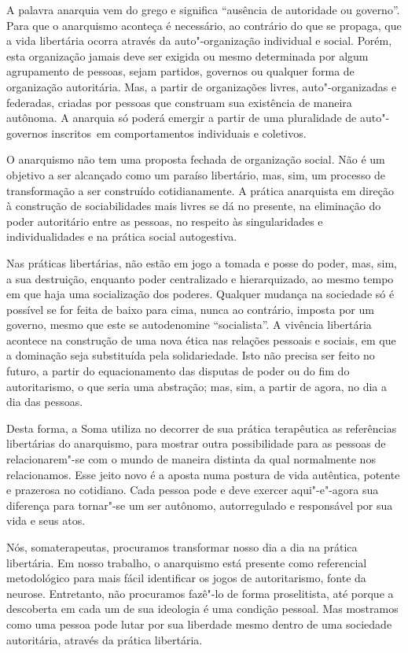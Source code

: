 A palavra anarquia vem do grego e significa ``ausência de autoridade ou
governo''. Para que o anarquismo aconteça é necessário, ao contrário do
que se propaga, que a vida libertária ocorra através da auto"-organização
individual e social. Porém, esta organização jamais deve ser exigida ou
mesmo determinada por algum agrupamento de pessoas, sejam partidos,
governos ou qualquer forma de organização autoritária. Mas, a partir de
organizações livres, auto"-organizadas e federadas, criadas por pessoas
que construam sua existência de maneira autônoma. A anarquia só poderá
emergir a partir de uma pluralidade de auto"-governos inscritos~em
comportamentos individuais e coletivos.

O anarquismo não tem uma proposta fechada de organização social. Não é
um objetivo a ser alcançado como um paraíso libertário, mas, sim, um
processo de transformação a ser construído cotidianamente. A prática
anarquista em direção à construção de sociabilidades mais livres se dá no
presente, na eliminação do poder autoritário entre as pessoas, no
respeito às singularidades e individualidades e na prática social
autogestiva.

Nas práticas libertárias, não estão em jogo a tomada e posse do poder,
mas, sim, a sua destruição, enquanto poder centralizado e hierarquizado,
ao mesmo tempo em que haja uma socialização dos poderes. Qualquer
mudança na sociedade só é possível se for feita de baixo para cima,
nunca ao contrário, imposta por um governo, mesmo que este se
autodenomine ``socialista''. A vivência libertária acontece na
construção de uma nova ética nas relações pessoais e sociais, em que a
dominação seja substituída pela solidariedade. Isto não precisa ser
feito no futuro, a partir do equacionamento das disputas de poder ou do
fim do autoritarismo, o que seria uma abstração; mas, sim, a partir de
agora, no dia a dia das pessoas.

Desta forma, a Soma utiliza no decorrer de sua prática terapêutica as
referências libertárias do anarquismo, para mostrar outra possibilidade
para as pessoas de relacionarem"-se com o mundo de maneira distinta da
qual normalmente nos relacionamos. Esse jeito novo é a aposta numa
postura de vida autêntica, potente e prazerosa no cotidiano. Cada pessoa
pode e deve exercer aqui"-e"-agora sua diferença para tornar"-se um ser
autônomo, autorregulado e responsável por sua vida e seus atos.

Nós, somaterapeutas, procuramos transformar nosso dia a dia na prática
libertária. Em nosso trabalho, o anarquismo está presente como
referencial metodológico para mais fácil identificar os jogos de
autoritarismo, fonte da neurose. Entretanto, não procuramos fazê"-lo de
forma proselitista, até porque a descoberta em cada um de sua ideologia
é uma condição pessoal. Mas mostramos como uma pessoa pode lutar por sua
liberdade mesmo dentro de uma sociedade autoritária, através da prática
libertária.

